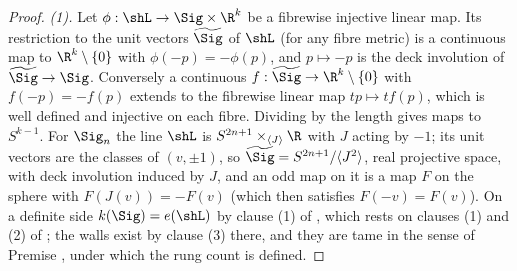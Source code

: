 \begin{proof}
\emph{(1).} Let $\phi : \shL \to \Sig \times \R^{k}$ be a fibrewise injective linear map. Its restriction to the unit vectors $\widetilde\Sig$ of $\shL$ (for any fibre metric) is a continuous map to $\R^{k} \setminus \{0\}$ with $\phi(-p) = -\phi(p)$, and $p \mapsto -p$ is the deck involution of $\widetilde\Sig \to \Sig$. Conversely a continuous $f : \widetilde\Sig \to \R^{k} \setminus \{0\}$ with $f(-p) = -f(p)$ extends to the fibrewise linear map $tp \mapsto tf(p)$, which is well defined and injective on each fibre. Dividing by the length gives maps to $S^{k-1}$. For $\Sig_{n}$ the line $\shL$ is $S^{2n+1} \times_{\langle J \rangle} \R$ with $J$ acting by $-1$; its unit vectors are the classes of $(v, \pm 1)$, so $\widetilde\Sig = S^{2n+1}/\langle J^{2} \rangle$, real projective space, with deck involution induced by $J$, and an odd map on it is a map $F$ on the sphere with $F(J(v)) = -F(v)$ (which then satisfies $F(-v) = F(v)$). On a definite side $k(\Sig) = e(\shL)$ by clause (1) of , which rests on clauses (1) and (2) of ; the walls exist by clause (3) there, and they are tame in the sense of Premise , under which the rung count is defined.


\end{proof}

